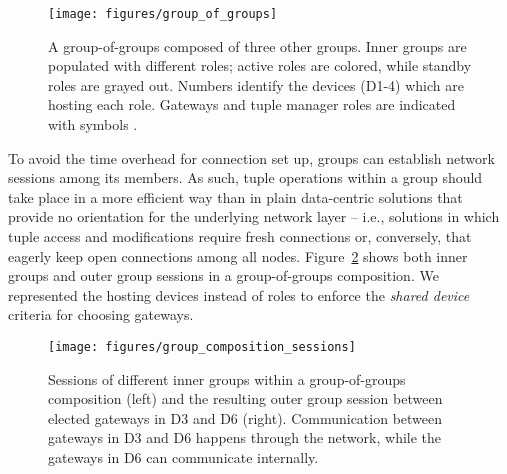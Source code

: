 
\begin{figure}[t!]
	\centering
	\texttt{[image: figures/group\_of\_groups]}
	\caption{A group-of-groups composed of three other groups. Inner groups are populated with different roles; active roles are colored, while standby roles are grayed out. Numbers identify the devices (D1-4) which are hosting each role. Gateways and tuple manager roles are indicated with symbols .}
	\label{fig:group_of_groups}
\end{figure}

To avoid the time overhead for connection set up, groups can establish network sessions among its members. As such, tuple operations within a group should take place in a more efficient way than in plain data-centric solutions that provide no orientation for the underlying network layer -- i.e., solutions in which tuple access and modifications require fresh connections or, conversely, that eagerly keep open connections among all nodes. Figure~\ref{fig:group_composition_sessions} shows both inner groups and outer group sessions in a group-of-groups composition. We represented the hosting devices instead of roles to enforce the \textit{shared device} criteria for choosing gateways.

\begin{figure}[t!]
	\centering
	\texttt{[image: figures/group\_composition\_sessions]}
	\caption{Sessions of different inner groups within a group-of-groups composition (left) and the resulting outer group session between elected gateways in D3 and D6 (right). Communication between gateways in D3 and D6 happens through the network, while the gateways in D6 can communicate internally.}
	\label{fig:group_composition_sessions}
\end{figure}


